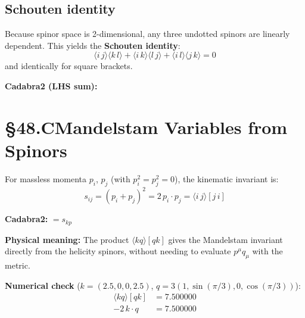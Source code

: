 
\subsection{Schouten identity}

Because spinor space is 2-dimensional, any three undotted spinors are linearly
dependent.  This yields the \textbf{Schouten identity}:
\begin{equation}
  \boxed{
    \langle i\,j\rangle\langle k\,l\rangle
    + \langle i\,k\rangle\langle l\,j\rangle
    + \langle i\,l\rangle\langle j\,k\rangle = 0
  }
  \tag{48.7}
\end{equation}
and identically for square brackets.

\textbf{Cadabra2 (LHS sum):} 


\section{§48.C\quad Mandelstam Variables from Spinors}

For massless momenta $p_i$, $p_j$ (with $p_i^2=p_j^2=0$), the kinematic invariant is:
\begin{equation}
  \boxed{
    s_{ij} = (p_i+p_j)^2 = 2\,p_i\cdot p_j = \langle i\,j\rangle[j\,i]
  }
  \tag{48.8}
\end{equation}

\textbf{Cadabra2:}  $= s_{kp}$

\medskip
\textbf{Physical meaning:} The product $\langle kq\rangle[qk]$ gives the
Mandelstam invariant directly from the helicity spinors, without needing to
evaluate $p^\mu q_\mu$ with the metric.

\textbf{Numerical check} ($k=(2.5,0,0,2.5)$, $q=3(1,\sin(\pi/3),0,\cos(\pi/3))$):
\begin{align*}
  \langle kq\rangle[qk] &= 7.500000 \\
  -2\,k\cdot q &= 7.500000
\end{align*}

